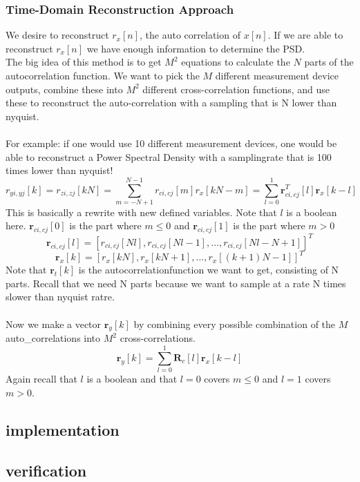 \documentclass[report, oneside, a4paper, openany]{memoir}
\begin{document}
\subsubsection{Time-Domain Reconstruction Approach}
We desire to reconstruct $r_x[n]$, the auto correlation of $x[n]$. If we are able to reconstruct $r_x[n]$ we have enough information to determine the PSD.\\
The big idea of this method is to get $M^2$ equations to calculate the $N$ parts of the autocorrelation function. We want to pick the $M$ different measurement device outputs, combine these into $M^2$ different cross-correlation functions, and use these to reconstruct the auto-correlation with a sampling that is N lower than nyquist. \\
\\
For example: if  one would use 10 different measurement devices, one would be able to reconstruct a Power Spectral Density with a samplingrate that is 100 times lower than nyquist!
$$
r_{yi,yj}[k] = r_{zi,zj}[kN] = \sum_{m=-N+1}^{N-1}r_{ci,cj}[m]r_x[kN-m] = \sum_{l=0}^1\mathbf{r}^T_{ci,cj}[l]\mathbf{r}_x[k-l]
$$
This is basically a rewrite with new defined variables. Note that $l$ is a boolean here. $\mathbf{r}_{ci,cj}[0]$ is the part where $m\leq 0$ and $\mathbf{r}_{ci,cj}[1]$ is the part where $m > 0$ 
$$
\mathbf{r}_{ci,cj}[l] = [r_{ci,cj}[Nl], r_{ci,cj}[Nl-1], \dots, r_{ci,cj}[Nl-N+1]]^T
$$
$$
\mathbf{r}_x[k]= [r_x[kN],r_x[kN+1],\dots,r_x[(k+1)N-1]]^T
$$
Note that $\mathbf{r}_t[k]$ is the autocorrelationfunction we want to get, consisting of N parts. Recall that we need N parts because we want to sample at a rate N times slower than nyquist ratre.\\
\\
Now we make a vector $\mathbf{r}_y[k]$ by combining every possible combination of the $M$ auto_correlations into $M^2$ cross-correlations.
$$
\mathbf{r}_y[k]=\sum_{l=0}^1\mathbf{R}_c[l]\mathbf{r}_x[k-l]
$$
Again recall that $l$ is a boolean and that $l=0$ covers $m\leq 0$ and $l=1$ covers $m > 0$.




\subsection{implementation}

\subsection{verification}
\end{document}
